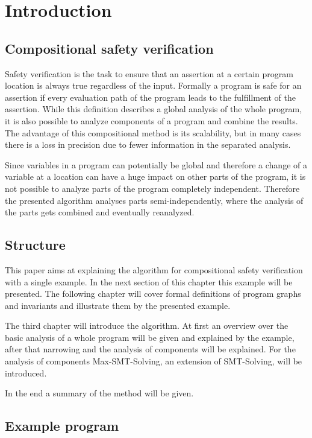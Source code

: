 \section{Introduction}
\label{sec:introduction}

\subsection{Compositional safety verification}

Safety verification is the task to ensure that an assertion at a certain program location is always true regardless of the input.
Formally a program is safe for an assertion if every evaluation path of the program leads to the fulfillment of the assertion.
While this definition describes a global analysis of the whole program, it is also possible to analyze components of a program and combine the results.
The advantage of this compositional method is its scalability, but in many cases there is a loss in precision due to fewer information in the separated analysis.

Since variables in a program can potentially be global and therefore a change of a variable at a location can have a huge impact on other parts of the program, it is not possible to analyze parts of the program completely independent.
Therefore the presented algorithm analyses parts semi-independently, where the analysis of the parts gets combined and eventually reanalyzed.

\subsection{Structure}

This paper aims at explaining the algorithm for compositional safety verification with a single example.
In the next section of this chapter this example will be presented.
The following chapter will cover formal definitions of program graphs and invariants and illustrate them by the presented example.

The third chapter will introduce the algorithm. 
At first an overview over the basic analysis of a whole program will be given and explained by the example, after that narrowing and the analysis of components will be explained.
For the analysis of components Max-SMT-Solving, an extension of SMT-Solving, will be introduced.

In the end a summary of the method will be given.

\subsection{Example program}

